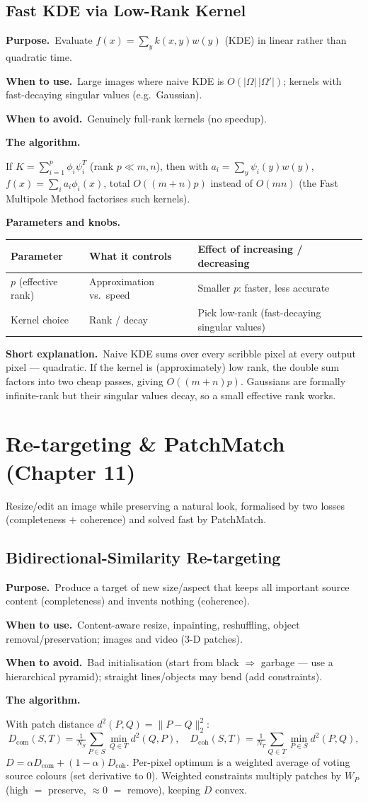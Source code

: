 \documentclass[10pt]{article}
\makeatletter
\newcommand{\Purpose}{\par\smallskip\textbf{Purpose.}\ }
\newcommand{\WhenUse}{\par\textbf{When to use.}\ }
\newcommand{\WhenAvoid}{\par\textbf{When to avoid.}\ }
\newcommand{\TheAlgo}{\par\smallskip\textbf{The algorithm.}\par\nopagebreak}
\newcommand{\Knobs}{\par\smallskip\textbf{Parameters and knobs.}\par\nopagebreak}
\newcommand{\ShortExp}{\par\smallskip\textbf{Short explanation.}\ }
\newenvironment{ptable}{\begin{center}\small\begin{tabular}{@{}p{2.5cm} p{5.9cm} p{6.2cm}@{}}\toprule
Parameter & What it controls & Effect of increasing / decreasing \\ \midrule}
{\bottomrule\end{tabular}\end{center}}
\makeatother
\begin{document}
\subsection{Fast KDE via Low-Rank Kernel}
\Purpose Evaluate $f(x)=\sum_{y}k(x,y)w(y)$ (KDE) in linear rather than quadratic time.
\WhenUse Large images where naive KDE is $O(|\Omega|\,|\Omega'|)$; kernels with fast-decaying singular
values (e.g.\ Gaussian).
\WhenAvoid Genuinely full-rank kernels (no speedup).
\TheAlgo If $K=\sum_{i=1}^p\phi_i\psi_i^T$ (rank $p\ll m,n$), then with $a_i=\sum_y\psi_i(y)w(y)$,
$f(x)=\sum_i a_i\phi_i(x)$, total $O((m+n)p)$ instead of $O(mn)$ (the Fast Multipole Method factorises such
kernels).
\Knobs
\begin{ptable}
$p$ (effective rank) & Approximation vs.\ speed & Smaller $p$: faster, less accurate \\
Kernel choice & Rank / decay & Pick low-rank (fast-decaying singular values) \\
\end{ptable}
\ShortExp Naive KDE sums over every scribble pixel at every output pixel --- quadratic. If the kernel is
(approximately) low rank, the double sum factors into two cheap passes, giving $O((m{+}n)p)$. Gaussians are
formally infinite-rank but their singular values decay, so a small effective rank works.

\newpage
\section{Re-targeting \& PatchMatch (Chapter 11)}
Resize/edit an image while preserving a natural look, formalised by two losses (completeness $+$ coherence)
and solved fast by PatchMatch.

\subsection{Bidirectional-Similarity Re-targeting}
\Purpose Produce a target of new size/aspect that keeps all important source content (completeness) and
invents nothing (coherence).
\WhenUse Content-aware resize, inpainting, reshuffling, object removal/preservation; images and video (3-D
patches).
\WhenAvoid Bad initialisation (start from black $\Rightarrow$ garbage --- use a hierarchical pyramid);
straight lines/objects may bend (add constraints).
\TheAlgo With patch distance $d^2(P,Q)=\|P-Q\|_2^2$:
\[
D_{\text{com}}(S,T)=\tfrac1{N_S}\!\sum_{P\in S}\min_{Q\in T}d^2(Q,P),\quad
D_{\text{coh}}(S,T)=\tfrac1{N_T}\!\sum_{Q\in T}\min_{P\in S}d^2(P,Q),
\]
$D=\alpha D_{\text{com}}+(1-\alpha)D_{\text{coh}}$. Per-pixel optimum is a weighted average of voting source
colours (set derivative to 0). Weighted constraints multiply patches by $W_P$ (high $=$ preserve, $\approx0$
$=$ remove), keeping $D$ convex.
\end{document}
